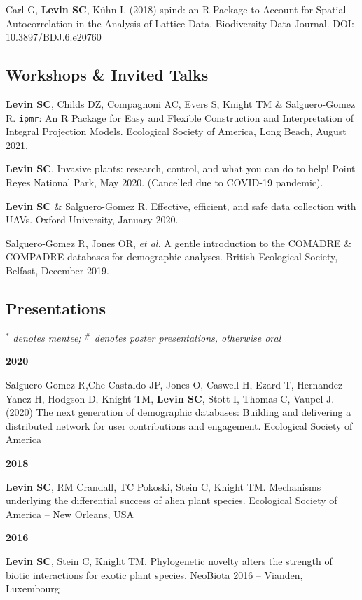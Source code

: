 \documentclass[11pt,]{article}
\begin{document}
Carl G, \textbf{Levin SC}, Kühn I. (2018) spind: an R Package to Account
for Spatial Autocorrelation in the Analysis of Lattice Data.
Biodiversity Data Journal. DOI: 10.3897/BDJ.6.e20760

\hypertarget{workshops-invited-talks}{%
\subsection{Workshops \& Invited Talks}\label{workshops-invited-talks}}

\textbf{Levin SC}, Childs DZ, Compagnoni AC, Evers S, Knight TM \&
Salguero-Gomez R. \texttt{ipmr}: An R Package for Easy and Flexible
Construction and Interpretation of Integral Projection Models.
Ecological Society of America, Long Beach, August 2021.

\textbf{Levin SC}. Invasive plants: research, control, and what you can
do to help! Point Reyes National Park, May 2020. (Cancelled due to
COVID-19 pandemic).

\textbf{Levin SC} \& Salguero-Gomez R. Effective, efficient, and safe
data collection with UAVs. Oxford University, January 2020.

Salguero-Gomez R, Jones OR, \emph{et al.} A gentle introduction to the
COMADRE \& COMPADRE databases for demographic analyses. British
Ecological Society, Belfast, December 2019.

\hypertarget{presentations}{%
\subsection{Presentations}\label{presentations}}

\(^\ast\) \emph{denotes mentee; \(^\#\) denotes poster presentations,
otherwise oral}

\textbf{2020}

Salguero-Gomez R,Che-Castaldo JP, Jones O, Caswell H, Ezard T,
Hernandez-Yanez H, Hodgson D, Knight TM, \textbf{Levin SC}, Stott I,
Thomas C, Vaupel J. (2020) The next generation of demographic databases:
Building and delivering a distributed network for user contributions and
engagement. Ecological Society of America

\textbf{2018}

\textbf{Levin SC}, RM Crandall, TC Pokoski, Stein C, Knight TM.
Mechanisms underlying the differential success of alien plant species.
Ecological Society of America -- New Orleans, USA

\textbf{2016}

\textbf{Levin SC}, Stein C, Knight TM. Phylogenetic novelty alters the
strength of biotic interactions for exotic plant species. NeoBiota 2016
-- Vianden, Luxembourg
\end{document}
